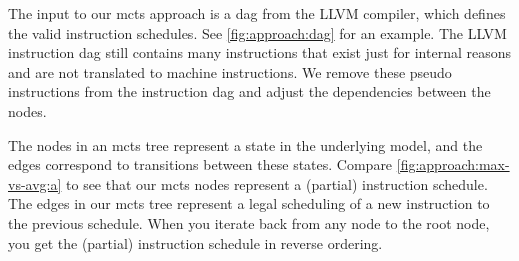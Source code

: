 The input to our \ac{mcts} approach is a \ac{dag} from the LLVM compiler, which defines the valid instruction schedules.
See \cref{fig:approach:dag} for an example.
The LLVM instruction \ac{dag} still contains many instructions that exist just for internal reasons and are not translated to machine instructions.
We remove these pseudo instructions from the instruction \ac{dag} and adjust the dependencies between the nodes.

The nodes in an \ac{mcts} tree represent a state in the underlying model, and the edges correspond to transitions between these states.
Compare \cref{fig:approach:max-vs-avg:a} to see that our \ac{mcts} nodes represent a (partial) instruction schedule.
The edges in our \ac{mcts} tree represent a legal scheduling of a new instruction to the previous schedule.
When you iterate back from any node to the root node, you get the (partial) instruction schedule in reverse ordering.
